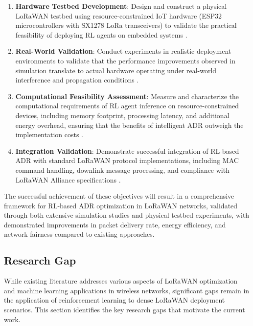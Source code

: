 \documentclass[12pt,a4paper]{article}
\begin{document}
\begin{enumerate}
    \item \textbf{Hardware Testbed Development}: Design and construct a physical LoRaWAN testbed using resource-constrained IoT hardware (ESP32 microcontrollers with SX1278 LoRa transceivers) to validate the practical feasibility of deploying RL agents on embedded systems \cite{hosseinzadeh2020empirical}.
    
    \item \textbf{Real-World Validation}: Conduct experiments in realistic deployment environments to validate that the performance improvements observed in simulation translate to actual hardware operating under real-world interference and propagation conditions \cite{liando2018real}.
    
    \item \textbf{Computational Feasibility Assessment}: Measure and characterize the computational requirements of RL agent inference on resource-constrained devices, including memory footprint, processing latency, and additional energy overhead, ensuring that the benefits of intelligent ADR outweigh the implementation costs \cite{farooq2019survey}.
    
    \item \textbf{Integration Validation}: Demonstrate successful integration of RL-based ADR with standard LoRaWAN protocol implementations, including MAC command handling, downlink message processing, and compliance with LoRaWAN Alliance specifications \cite{adelantado2017understanding}.
\end{enumerate}

The successful achievement of these objectives will result in a comprehensive framework for RL-based ADR optimization in LoRaWAN networks, validated through both extensive simulation studies and physical testbed experiments, with demonstrated improvements in packet delivery rate, energy efficiency, and network fairness compared to existing approaches.

\subsection{Research Gap}
\label{subsec:research_gap}

While existing literature addresses various aspects of LoRaWAN optimization and machine learning applications in wireless networks, significant gaps remain in the application of reinforcement learning to dense LoRaWAN deployment scenarios. This section identifies the key research gaps that motivate the current work.
\end{document}
